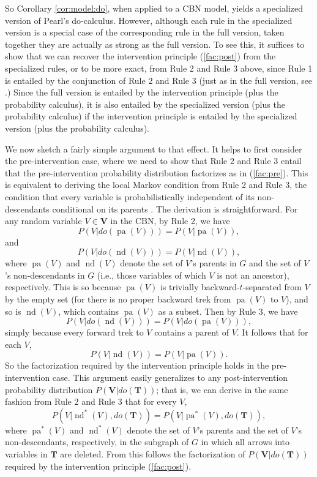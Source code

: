 \documentclass[12pt]{amsart}
\theoremstyle{plain}
\theoremstyle{definition}
\theoremstyle{remark}
\numberwithin{equation}{section}
\theoremstyle{plain}
\newcommand{\0}{\emptyset}
\DeclareMathOperator{\pa}{pa}
\DeclareMathOperator{\nd}{nd}
\begin{document}
So Corollary \ref{cor:model:do}, when applied to a CBN model, yields a specialized version of Pearl's do-calculus. However, although each rule in the specialized version is a special case of the corresponding rule in the full version, taken together they are actually as strong as the full version. To see this, it suffices to show that we can recover the intervention principle (\ref{fac:post}) from the specialized rules, or to be more exact, from Rule 2 and Rule 3 above, since Rule 1 is entailed by the conjunction of Rule 2 and Rule 3 (just as in the full version, see \cite{HV2006}.) Since the full version is entailed by the intervention principle (plus the probability calculus), it is also entailed by the specialized version (plus the probability calculus) if the intervention principle is entailed by the specialized version (plus the probability calculus).

We now sketch a fairly simple argument to that effect. It helps to first consider the pre-intervention case, where we need to show that Rule 2 and Rule 3 entail that the pre-intervention probability distribution factorizes as in (\ref{fac:pre}). This is equivalent to deriving the local Markov condition from Rule 2 and Rule 3, the condition that every variable is probabilistically independent of its non-descendants conditional on its parents \cite{SGS2000}. The derivation is straightforward. For any random variable $V\in \mathbf{V}$ in the CBN, by Rule 2, we have
\[
P(V | do(\pa(V))) = P(V | \pa(V)),
\]
and
\[
P(V | do(\nd(V))) = P(V | \nd(V)),
\]
where $\pa(V)$ and $\nd(V)$ denote the set of $V$'s parents in $G$ and the set of $V$'s non-descendants in $G$ (i.e., those variables of which $V$ is not an ancestor), respectively. This is so because $\pa(V)$ is trivially backward-$t$-separated from $V$ by the empty set (for there is no proper backward trek from $\pa(V) $ to $V$), and so is $\nd(V)$, which contains $\pa(V)$ as a subset. Then by Rule 3, we have
\[
P(V | do(\nd(V))) = P(V | do(\pa(V))),
\]
simply because every forward trek to $V$ contains a parent of $V$. It follows that for each $V$, \[
P(V | \nd(V)) = P(V | \pa(V)).
\]
So the factorization required by the intervention principle holds in the pre-intervention case. This argument easily generalizes to any post-intervention probability distribution $P(\mathbf{V}|do(\mathbf{T}))$; that is, we can derive in the same fashion from Rule 2 and Rule 3 that for every $V$,
\[
P(V | \nd^*(V), do(\mathbf{T})) = P(V | \pa^*(V), do(\mathbf{T})),
\]
where $\pa^*(V)$ and $\nd^*(V)$ denote the set of $V$'s parents and the set of $V$'s non-descendants, respectively, in the subgraph of $G$ in which all arrows into variables in $\mathbf{T}$ are deleted.
From this follows the factorization of $P(\mathbf{V}|do(\mathbf{T}))$ required by the intervention principle (\ref{fac:post}).
\end{document}
